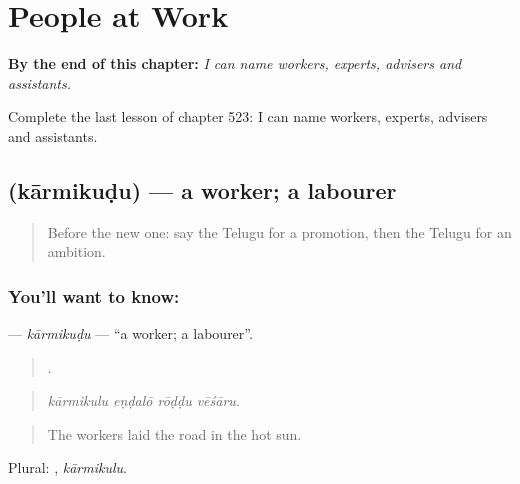 
\chapter{People at Work}
\label{ch:te-people-at-work}

\begin{chapteropening}
\textbf{By the end of this chapter:} \emph{I can name workers, experts, advisers and assistants.}

Complete the last lesson of chapter 523: I can name workers, experts, advisers and assistants.
\end{chapteropening}

\section[\texorpdfstring{\te{కార్మికుడు} (kārmikuḍu)}{కార్మికుడు (kārmikuḍu)}]{ (kārmikuḍu) — a worker; a labourer}

\label{lesson:TE-C523-karmikudu}



\begin{quote}
Before the new one: say the Telugu for a promotion, then the Telugu for an ambition.
\end{quote}

\subsection*{You'll want to know: }
\textbf{} — \emph{kārmikuḍu} — \textquotedblleft{}a worker; a labourer\textquotedblright{}.

\begin{quote}
   .
\end{quote}

\begin{quote}
\emph{kārmikulu eṇḍalō rōḍḍu vēśāru.}
\end{quote}

\begin{quote}
The workers laid the road in the hot sun.
\end{quote}

Plural: , \emph{kārmikulu}.

